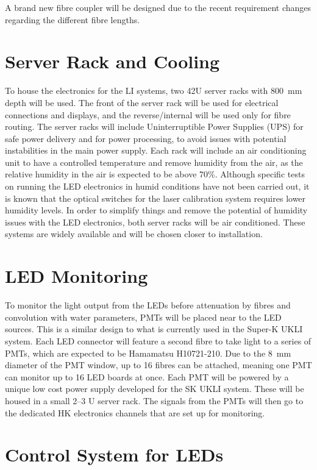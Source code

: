 \documentclass[a4paper,11pt]{article}
\begin{document}
A brand new fibre coupler will be designed due to the recent requirement changes regarding the different fibre lengths.


\section{Server Rack and Cooling}

To house the electronics for the LI systems, two 42U server racks with 800~mm depth will be used. The front of the server rack will be used for electrical connections and displays, and the reverse/internal will be used only for fibre routing. The server racks will include Uninterruptible Power Supplies (UPS) for safe power delivery and for power processing, to avoid issues with potential instabilities in the main power supply. Each rack will include an air conditioning unit to have a controlled temperature and remove humidity from the air, as the relative humidity in the air is expected to be above 70\%. Although specific tests on running the LED electronics in humid conditions have not been carried out, it is known that the optical switches for the laser calibration system requires lower humidity levels. In order to simplify things and remove the potential of humidity issues with the LED electronics,  both server racks will be air conditioned. These systems are widely available and will be chosen closer to installation.

\section{LED Monitoring}

To monitor the light output from the LEDs before attenuation by fibres and convolution with water parameters, PMTs will be placed near to the LED sources. This is a similar design to what is currently used in the Super-K UKLI system. Each LED connector will feature a second fibre to take light to a series of PMTs, which are expected to be Hamamatsu H10721-210. Due to the 8~mm diameter of the PMT window, up to 16 fibres can be attached, meaning one PMT can monitor up to 16 LED boards at once. Each PMT will be powered by a unique low cost power supply developed for the SK UKLI system. These will be housed in a small 2--3 U server rack. The signals from the PMTs will then go to the dedicated HK electronics channels that are set up for monitoring.

\section{Control System for LEDs}\label{sec:LEDcontrol}
\end{document}

